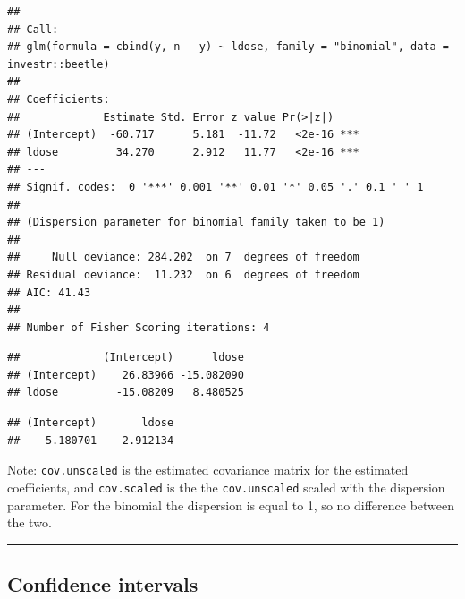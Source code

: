 \documentclass[
]{article}
\newenvironment{Shaded}{\begin{snugshade}}{\end{snugshade}}
\newcommand{\FunctionTok}[1]{\textcolor[rgb]{0.13,0.29,0.53}{\textbf{#1}}}
\newcommand{\NormalTok}[1]{#1}
\newcommand{\SpecialCharTok}[1]{\textcolor[rgb]{0.81,0.36,0.00}{\textbf{#1}}}
\begin{document}
\begin{verbatim}
## 
## Call:
## glm(formula = cbind(y, n - y) ~ ldose, family = "binomial", data = investr::beetle)
## 
## Coefficients:
##             Estimate Std. Error z value Pr(>|z|)    
## (Intercept)  -60.717      5.181  -11.72   <2e-16 ***
## ldose         34.270      2.912   11.77   <2e-16 ***
## ---
## Signif. codes:  0 '***' 0.001 '**' 0.01 '*' 0.05 '.' 0.1 ' ' 1
## 
## (Dispersion parameter for binomial family taken to be 1)
## 
##     Null deviance: 284.202  on 7  degrees of freedom
## Residual deviance:  11.232  on 6  degrees of freedom
## AIC: 41.43
## 
## Number of Fisher Scoring iterations: 4
\end{verbatim}

\begin{Shaded}
\end{Shaded}

\begin{verbatim}
##             (Intercept)      ldose
## (Intercept)    26.83966 -15.082090
## ldose         -15.08209   8.480525
\end{verbatim}

\begin{Shaded}
\end{Shaded}

\begin{verbatim}
## (Intercept)       ldose 
##    5.180701    2.912134
\end{verbatim}

Note: \texttt{cov.unscaled} is the estimated covariance matrix for the
estimated coefficients, and \texttt{cov.scaled} is the the
\texttt{cov.unscaled} scaled with the dispersion parameter. For the
binomial the dispersion is equal to 1, so no difference between the two.

\begin{center}\rule{0.5\linewidth}{0.5pt}\end{center}

\hypertarget{confidence-intervals}{%
\subsection{Confidence intervals}\label{confidence-intervals}}
\end{document}

